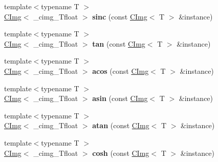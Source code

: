 \begin{DoxyCompactItemize}
{\footnotesize template$<$typename T $>$ }\\\hyperlink{structcimg__library__suffixed_1_1CImg}{C\+Img}$<$ \+\_\+cimg\+\_\+\+Tfloat $>$ {\bfseries sinc} (const \hyperlink{structcimg__library__suffixed_1_1CImg}{C\+Img}$<$ T $>$ \&instance)
\item 
\mbox{\label{namespacecimg__library__suffixed_adf6af236b90c91a9d3ac434babe57b03}} 
{\footnotesize template$<$typename T $>$ }\\\hyperlink{structcimg__library__suffixed_1_1CImg}{C\+Img}$<$ \+\_\+cimg\+\_\+\+Tfloat $>$ {\bfseries tan} (const \hyperlink{structcimg__library__suffixed_1_1CImg}{C\+Img}$<$ T $>$ \&instance)
\item 
\mbox{\label{namespacecimg__library__suffixed_a45e323770cb5807fff70424113710fa9}} 
{\footnotesize template$<$typename T $>$ }\\\hyperlink{structcimg__library__suffixed_1_1CImg}{C\+Img}$<$ \+\_\+cimg\+\_\+\+Tfloat $>$ {\bfseries acos} (const \hyperlink{structcimg__library__suffixed_1_1CImg}{C\+Img}$<$ T $>$ \&instance)
\item 
\mbox{\label{namespacecimg__library__suffixed_aeef57d42f5e4792d4cca6efe8b3144de}} 
{\footnotesize template$<$typename T $>$ }\\\hyperlink{structcimg__library__suffixed_1_1CImg}{C\+Img}$<$ \+\_\+cimg\+\_\+\+Tfloat $>$ {\bfseries asin} (const \hyperlink{structcimg__library__suffixed_1_1CImg}{C\+Img}$<$ T $>$ \&instance)
\item 
\mbox{\label{namespacecimg__library__suffixed_ad67ec1fcb333b3ae29c6f98ff68e9364}} 
{\footnotesize template$<$typename T $>$ }\\\hyperlink{structcimg__library__suffixed_1_1CImg}{C\+Img}$<$ \+\_\+cimg\+\_\+\+Tfloat $>$ {\bfseries atan} (const \hyperlink{structcimg__library__suffixed_1_1CImg}{C\+Img}$<$ T $>$ \&instance)
\item 
\mbox{\label{namespacecimg__library__suffixed_a82540c55c7d8c8ffad6a0aeac1e32ccb}} 
{\footnotesize template$<$typename T $>$ }\\\hyperlink{structcimg__library__suffixed_1_1CImg}{C\+Img}$<$ \+\_\+cimg\+\_\+\+Tfloat $>$ {\bfseries cosh} (const \hyperlink{structcimg__library__suffixed_1_1CImg}{C\+Img}$<$ T $>$ \&instance)

\end{DoxyCompactItemize}
